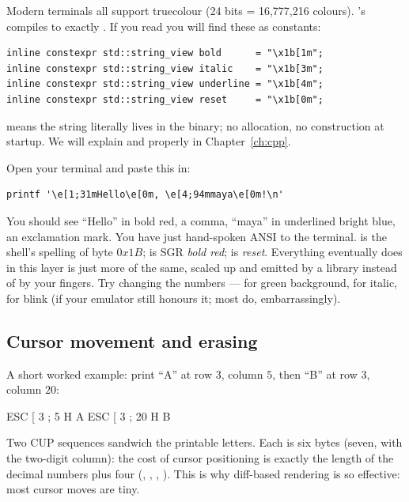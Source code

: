 Modern terminals all support truecolour (24 bits = 16,777,216 colours).
\maya{}'s  compiles to exactly \code{ESC [ 38 ; 2 ;
R ; G ; B m}. If you read 
you will find these as  constants:

\begin{lstlisting}
inline constexpr std::string_view bold      = "\x1b[1m";
inline constexpr std::string_view italic    = "\x1b[3m";
inline constexpr std::string_view underline = "\x1b[4m";
inline constexpr std::string_view reset     = "\x1b[0m";
\end{lstlisting}

 means the string literally lives in the binary; no
allocation, no construction at startup. We will explain
 and  properly in
Chapter~\ref{ch:cpp}.

\begin{tryit}
Open your terminal and paste this in:
\begin{lstlisting}[style=shell]
printf '\e[1;31mHello\e[0m, \e[4;94mmaya\e[0m!\n'
\end{lstlisting}
You should see ``Hello'' in bold red, a comma, ``maya'' in underlined
bright blue, an exclamation mark. You have just hand-spoken ANSI to
the terminal.  is the shell's spelling of
byte $0x1B$; \code{[1;31m} is SGR \emph{bold red}; \code{[0m} is
\emph{reset}. Everything \maya{} eventually does in this layer is
just more of the same, scaled up and emitted by a library instead of
by your fingers. Try changing the numbers --- \code{[42m} for green
background, \code{[3m} for italic, \code{[5m} for blink (if your
emulator still honours it; most do, embarrassingly).
\end{tryit}


\subsection{Cursor movement and erasing}

A short worked example: print ``A'' at row $3$, column $5$, then
``B'' at row $3$, column $20$:

\begin{terminalbox}
ESC [ 3 ; 5 H A ESC [ 3 ; 20 H B
\end{terminalbox}

Two CUP sequences sandwich the printable letters. Each is six bytes
(seven, with the two-digit column): the cost of cursor positioning is
exactly the length of the decimal numbers plus four (,
\code{[}, \code{;}, ). This is why diff-based rendering is so
effective: most cursor moves are tiny.

